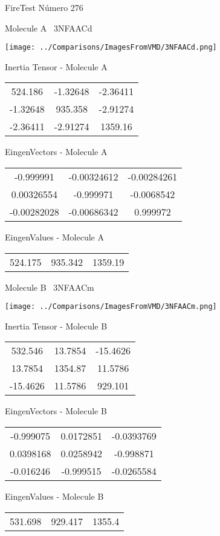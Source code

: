\vtab[-3cm]
\begin{center}
{\large FireTest \tab Número 276}
\end{center}
\begin{multicols}{2}
\begin{center}

Molecule A \
3NFAACd

\texttt{[image: ../Comparisons/ImagesFromVMD/3NFAACd.png]}

Inertia Tensor - Molecule A \\
\begin{tabular}{|c c c|}
524.186	 & 	-1.32648	 & 	-2.36411	 \\
-1.32648	 & 	935.358	 & 	-2.91274	 \\
-2.36411	 & 	-2.91274	 & 	1359.16
\end{tabular}

\vtab
 EingenVectors - Molecule A     \\
\begin{tabular}{|c c c|}
-0.999991	 & 	-0.00324612	 & 	-0.00284261	 \\
0.00326554	 & 	-0.999971	 & 	-0.0068542	 \\
-0.00282028	 & 	-0.00686342	 & 	0.999972
\end{tabular}

\vtab
 EingenValues - Molecule A     \\
\begin{tabular}{|c c c|}
524.175	 & 	935.342	 & 	1359.19	 \\
\end{tabular}
\columnbreak

Molecule B \
3NFAACm

\texttt{[image: ../Comparisons/ImagesFromVMD/3NFAACm.png]}

Inertia Tensor - Molecule B \\
\begin{tabular}{|c c c|}
532.546	 & 	13.7854	 & 	-15.4626	 \\
13.7854	 & 	1354.87	 & 	11.5786	 \\
-15.4626	 & 	11.5786	 & 	929.101
\end{tabular}

\vtab
 EingenVectors - Molecule B     \\
\begin{tabular}{|c c c|}
-0.999075	 & 	0.0172851	 & 	-0.0393769	 \\
0.0398168	 & 	0.0258942	 & 	-0.998871	 \\
-0.016246	 & 	-0.999515	 & 	-0.0265584
\end{tabular}

\vtab
 EingenValues - Molecule B     \\
\begin{tabular}{|c c c|}
531.698	 & 	929.417	 & 	1355.4	 \\
\end{tabular}

\end{center}
\end{multicols}

